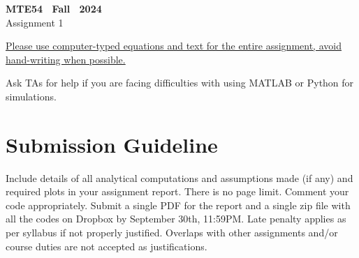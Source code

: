\documentclass{article}
\begin{document}
\begin{center}
     \textbf{MTE54 \ Fall \ 2024}\\
     Assignment 1
\end{center}

\underline{Please use computer-typed equations and text for the entire assignment, avoid hand-writing when possible.}





\newpage
Ask TAs for help if you are facing difficulties with using MATLAB or Python for simulations.

\section*{Submission Guideline}

Include details of all analytical computations and assumptions made (if any) and required plots in your assignment report. There is no page limit. Comment your code appropriately.
Submit a single PDF for the report and a single zip file with all the codes on Dropbox by September 30th, 11:59PM. Late penalty applies as per syllabus if not properly justified. Overlaps with other assignments and/or course duties are not accepted as justifications.
\end{document}
